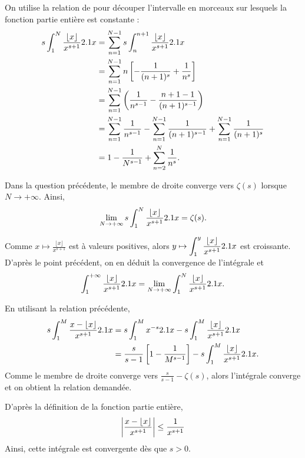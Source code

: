 \begin{solution}
\begin{reponses}
\item On utilise la relation de  pour découper l'intervalle en morceaux sur lesquels la fonction partie entière est constante :
\begin{align*}
s \int_1^N \frac{\lfloor x\rfloor}{x^{s+1}} 2.1 x &= \sum_{n=1}^{N-1} s \int_n^{n+1} \frac{\lfloor x\rfloor}{x^{s+1}} 2.1 x\\
&= \sum_{n=1}^{N-1} n \left[-\frac{1}{(n+1)^s} + \frac{1}{n^s}\right] \\
&= \sum_{n=1}^{N-1} \left(\frac{1}{n^{s-1}} - \frac{n + 1 - 1}{(n+1)^{s-1}}\right) \\
&= \sum_{n=1}^{N-1} \frac{1}{n^{s-1}} - \sum_{n=1}^{N-1} \frac{1}{(n+1)^{s-1}} + \sum_{n=1}^{N-1} \frac{1}{(n+1)^s} \\
&= 1 - \frac{1}{N^{s-1}} + \sum_{n=2}^N \frac{1}{n^s}.
\end{align*}

\item Dans la question précédente, le membre de droite converge vers $\zeta(s)$ lorsque $N \to +\infty$. Ainsi,
\[
\lim_{N\to+\infty} s \int_1^N \frac{\lfloor x\rfloor}{x^{s + 1}} 2.1 x = \zeta(s).
\]

Comme $x \mapsto \frac{\lfloor x\rfloor}{x^{s + 1}}$ est à valeurs positives, alors $y \mapsto \displaystyle\int_1^y \frac{\lfloor x\rfloor}{x^{s + 1}} 2.1 x$ est croissante. D'après le point précédent, on en déduit la convergence de l'intégrale et
\[
\int_1^{+\infty} \frac{\lfloor x\rfloor}{x^{s + 1}} 2.1 x
= \lim_{N\to+\infty} \int_1^N \frac{\lfloor x\rfloor}{x^{s + 1}} 2.1 x.
\]

\item En utilisant la relation précédente,
\begin{align*}
s \int_1^M \frac{x - \lfloor x\rfloor}{x^{s+1}} 2.1 x &= s \int_1^M x^{-s} 2.1 x - s \int_1^M \frac{\lfloor x\rfloor}{x^{s+1}} 2.1 x \\
&= \frac{s}{s-1} \left[1 - \frac{1}{M^{s-1}}\right] - s \int_1^M \frac{\lfloor x\rfloor}{x^{s+1}} 2.1 x.
\end{align*}
Comme le membre de droite converge vers $\frac{s}{s-1} - \zeta(s)$, alors l'intégrale converge et on obtient la relation demandée.

\item D'après la définition de la fonction partie entière,
\[
\abs{\frac{x-\lfloor x\rfloor}{x^{s+1}}} \leq \frac{1}{x^{s+1}}
\]
Ainsi, cette intégrale est convergente dès que $s > 0$.
\end{reponses}
\end{solution}